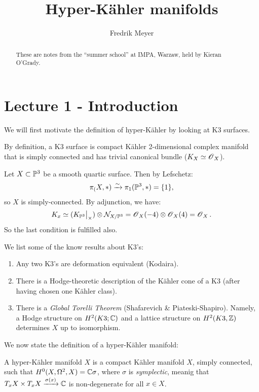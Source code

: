 \documentclass[11pt, english]{article}
\begin{document}
\title{Hyper-Kähler manifolds}
\author{Fredrik Meyer}
\maketitle 

\begin{abstract}
These are notes from the ``summer school'' at IMPA, Warzaw, held by Kieran O'Grady.
\end{abstract}

\section{Lecture 1 - Introduction}

We will first motivate the definition of hyper-Kähler by looking at K3 surfaces. 

By definition, a K3 surface is compact Kähler 2-dimensional complex manifold that is simply connected and has trivial canonical bundle ($K_X \simeq \operatorname{\mathscr{O}}_X$).

\begin{example}
Let $X \subset \mathbb{P}^3$ be a smooth quartic surface. Then by Lefschetz:
$$
\pi_(X,\ast) \xrightarrow{\sim} \pi_1(\mathbb{P}^3,\ast) = \{1\},
$$
so $X$ is simply-connected. By adjunction, we have:
$$
K_x \simeq (\restr{K_{\PP^3}}{\X}) \otimes \mathcal N_{X/\PP^3} = \OO_X(-4) \otimes \OO_X(4) = \OO_X.
$$
So the last condition is fulfilled also.
\end{example}

We list some of the know results about K3's:

\begin{enumerate}
\item Any two K3's are deformation equivalent (Kodaira).
\item There is a Hodge-theoretic description of the Kähler cone of a K3 (after having chosen one Kähler class).
\item There is a \emph{Global Torelli Theorem} (Shafarevich & Piateski-Shapiro). Namely, a Hodge structure on $H^2(K3; \mathbb{C})$ and a lattice structure on $H^2(K3,\mathbb{Z})$ determines $X$ up to isomorphism.
\end{enumerate}

We now state the definition of a hyper-Kähler manifold:

A hyper-Kähler manifold $X$ is a compact Kähler manifold $X$, simply connected, such that $H^0(X,\Omega^2,X) = \mathbb{C} \sigma$, where $\sigma$ is \emph{symplectic}, meanig that $T_xX \times T_xX \xrightarrow{\sigma(x)} \mathbb{C}$ is non-degenerate for all $x \in X$.
\end{document}
